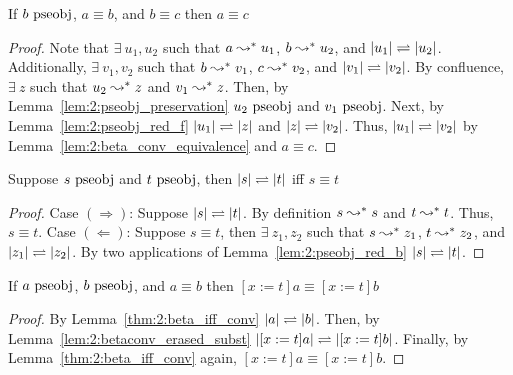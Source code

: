 \begin{theorem}
    If $b~\mbox{\normalfont pseobj}$, $a \equiv b$, and $b \equiv c$ then $a \equiv c$
    \label{thm:2:conv_trans}
\end{theorem}
\begin{proof}
    Note that $\exists\ u_1, u_2$ such that $a \leadsto^* u_1$, $b \leadsto^* u_2$, and $|u_1| \rightleftharpoons |u_2|$.
    Additionally, $\exists\ v_1, v_2$ such that $b \leadsto^* v_1$, $c \leadsto^* v_2$, and $|v_1| \rightleftharpoons |v_2|$.
    By confluence, $\exists\ z$ such that $u_2 \leadsto^* z$ and $v_1 \leadsto^* z$.
    Then, by Lemma~\ref{lem:2:pseobj_preservation} $u_2~\mbox{\normalfont pseobj}$ and $v_1~\mbox{\normalfont pseobj}$.
    Next, by Lemma~\ref{lem:2:pseobj_red_f} $|u_1| \rightleftharpoons |z|$ and $|z| \rightleftharpoons |v_2|$.
    Thus, $|u_1| \rightleftharpoons |v_2|$ by Lemma~\ref{lem:2:beta_conv_equivalence} and $a \equiv c$.
\end{proof}

\begin{theorem}
    Suppose $s~\mbox{\normalfont pseobj}$ and $t~\mbox{\normalfont pseobj}$, then $|s| \rightleftharpoons |t|$ iff $s \equiv t$
    \label{thm:2:beta_iff_conv}
\end{theorem}
\begin{proof}
    Case $(\Rightarrow)$:
    Suppose $|s| \rightleftharpoons |t|$.
    By definition $s \leadsto^* s$ and $t \leadsto^* t$.
    Thus, $s \equiv t$.
    Case $(\Leftarrow)$:
    Suppose $s \equiv t$, then $\exists\ z_1, z_2$ such that $s \leadsto^* z_1$, $t \leadsto^* z_2$, and $|z_1| \rightleftharpoons |z_2|$.
    By two applications of Lemma~\ref{lem:2:pseobj_red_b} $|s| \rightleftharpoons |t|$.
\end{proof}

\begin{lemma}
    If $a~\mbox{\normalfont pseobj}$, $b~\mbox{\normalfont pseobj}$, and $a \equiv b$ then $[x := t]a \equiv [x := t]b$
    \label{lem:2:conv_subst}
\end{lemma}
\begin{proof}
    By Lemma~\ref{thm:2:beta_iff_conv} $|a| \rightleftharpoons |b|$.
    Then, by Lemma~\ref{lem:2:betaconv_erased_subst} $|[x := t]a| \rightleftharpoons |[x := t]b|$.
    Finally, by Lemma~\ref{thm:2:beta_iff_conv} again, $[x := t]a \equiv [x := t]b$.
\end{proof}







